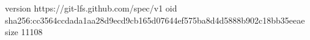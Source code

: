version https://git-lfs.github.com/spec/v1
oid sha256:cc3564ccdada1aa28d9ecd9cb165d07644ef575ba8d4d5888b902c18bb35eeae
size 11108
